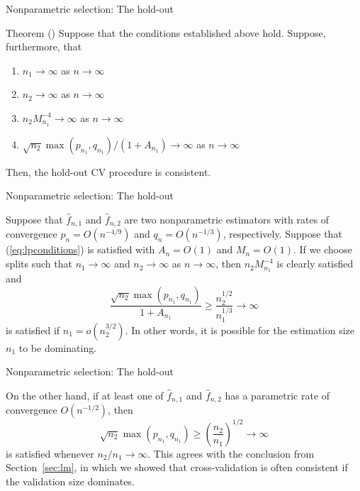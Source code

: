 \documentclass{beamer}
\newcommand{\0}{\emptyset}
\newcommand{\paren}[1]{\left(#1 \right)}
\newcommand{\fhat}[2]{\hat{f}_{#1, #2}}
\newcommand{\1}{\mathmybb{1}}
\begin{document}
\begin{frame}{Nonparametric selection: The hold-out}
\begin{block}{Theorem (\cite{yang_2007})}
    Suppose that the conditions established above hold. Suppose, furthermore, that
    \begin{enumerate}
        \item \(n_{1}\to\infty\) as \(n\to\infty\)
        \item \(n_{2}\to\infty\) as \(n\to\infty\)
        \item \(n_{2}M_{n_{1}}^{-4} \to \infty\) as \(n\to\infty\)
        \item \(\sqrt{n_{2}}\max(p_{n_{1}}, q_{n_{1}})/\paren{1+A_{n_{1}}}\to\infty \) as \(n\to\infty\)
    \end{enumerate}
    Then, the hold-out CV procedure is consistent.
\end{block}
\end{frame}

\begin{frame}{Nonparametric selection: The hold-out}
  \begin{example}
    Suppose that \(\fhat{n}{1}\) and \(\fhat{n}{2}\) are two nonparametric estimators with rates of convergence \(p_{n}=O\paren{n^{-4/9}}\) and \(q_{n}=O\paren{n^{-1/3}}\), respectively. Suppose that (\ref{eq:lpconditions}) is satisfied with \(A_{n} = O(1)\) and \(M_{n}=O(1)\). If we choose splits such that \(n_{1}\to\infty\) and \(n_{2}\to\infty\) as \(n\to\infty\), then \(n_{2}M_{n_{1}}^{-4}\) is clearly satisfied and 
    \[\frac{\sqrt{n_{2}}\max(p_{n_{1}}, q_{n_{1}})}{1+A_{n_{1}}} \geq \frac{n_{2}^{1/2}}{n_{1}^{1/3}}\to\infty \]
    is satisfied if \(n_{1}=o\paren{n_{2}^{3/2}}\). In other words, it is possible for the estimation size \(n_{1}\) to be dominating.
  \end{example}
\end{frame}

\begin{frame}{Nonparametric selection: The hold-out}
  \begin{example}
    On the other hand, if at least one of \(\fhat{n}{1}\) and \(\fhat{n}{2}\) has a parametric rate of convergence \(O(n^{-1/2})\), then
    \[\sqrt{n_{2}}\max(p_{n_{1}},q_{n_{1}})\geq \paren{\frac{n_{2}}{n_{1}}}^{1/2}\to\infty\]
    is satisfied whenever \(n_{2}/n_{1}\to\infty\). This agrees with the conclusion from Section~\ref{sec:lm}, in which we showed that cross-validation is often consistent if the validation size dominates.
  \end{example}
\end{frame}
\end{document}
